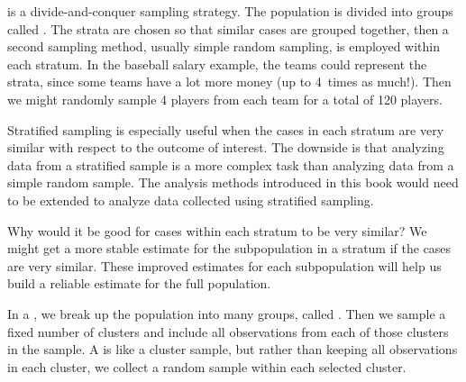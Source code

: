 is a divide-and-conquer sampling strategy. The population is divided into groups called . The strata are chosen so that similar cases are grouped together, then a second sampling method, usually simple random sampling, is employed within each stratum. In the baseball salary example, the teams could represent the strata, since some teams have a lot more money (up to 4~times as much!). Then we might randomly sample 4 players from each team for a total of 120 players.

Stratified sampling is especially useful when the cases in each stratum are very similar with respect to the outcome of interest. The downside is that analyzing data from a stratified sample is a more complex task than analyzing data from a simple random sample. The analysis methods introduced in this book would need to be extended to analyze data collected using stratified sampling.

\begin{example}{Why would it be good for cases within each stratum to be very similar?}
We might get a more stable estimate for the subpopulation in a stratum if the cases are very similar. These improved estimates for each subpopulation will help us build a reliable estimate for the full population.
\end{example}

In a , we break up the population into many groups, called . Then we sample a fixed number of clusters and include all observations from each of those clusters in the sample. A  is like a cluster sample, but rather than keeping all observations in each cluster, we collect a random sample within each selected cluster. %

